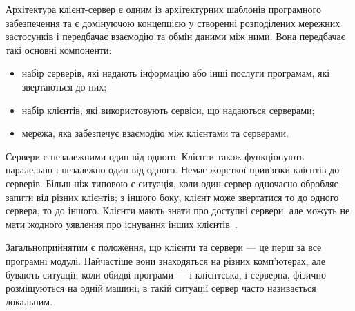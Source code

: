 Архітектура клієнт-сервер є одним із архітектурних шаблонів програмного забезпечення та є домінуючою концепцією у створенні розподілених мережних застосунків і передбачає взаємодію та обмін даними між ними. Вона передбачає такі основні компоненти:
\begin{itemize}
	\item набір серверів, які надають інформацію або інші послуги програмам, які звертаються до них;
	\item набір клієнтів, які використовують сервіси, що надаються серверами;
	\item мережа, яка забезпечує взаємодію між клієнтами та серверами.
\end{itemize}

Сервери є незалежними один від одного. Клієнти також функціонують паралельно і незалежно один від одного. Немає жорсткої прив'язки клієнтів до серверів. Більш ніж типовою є ситуація, коли один сервер одночасно обробляє запити від різних клієнтів; з іншого боку, клієнт може звертатися то до одного сервера, то до іншого. Клієнти мають знати про доступні сервери, але можуть не мати жодного уявлення про існування інших клієнтів~\cite{douglowe1997}.

Загальноприйнятим є положення, що клієнти та сервери — це перш за все програмні модулі. Найчастіше вони знаходяться на різних комп'ютерах, але бувають ситуації, коли обидві програми — і клієнтська, і серверна, фізично розміщуються на одній машині; в такій ситуації сервер часто називається локальним.
